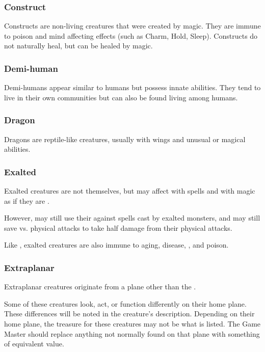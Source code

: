\begin{multicols*}{2}
\subsubsection{Construct}
Constructs are non-living creatures that were created by magic. They are immune to poison and mind affecting effects (such as Charm, Hold, Sleep). Constructs do not naturally heal, but can be healed by magic.

\subsubsection{Demi-human}
Demi-humans appear similar to humans but possess innate abilities. They tend to live in their own communities but can also be found living among humans.

\subsubsection{Dragon}
Dragons are reptile-like creatures, usually with wings and unusual or magical abilities.

\subsubsection{Exalted}
Exalted creatures are not  themselves, but may affect  with spells and with magic as if they are .

However,  may still use their  against spells cast by exalted monsters, and may still save vs. physical attacks to take half damage from their physical attacks.

Like , exalted creatures are also immune to aging, disease, , and poison.

\subsubsection{Extraplanar}
Extraplanar creatures originate from a plane other than the .

Some of these creatures look, act, or function differently on their home plane. These differences will be noted in the creature's description. Depending on their home plane, the treasure for these creatures may not be what is listed. The Game Master should replace anything not normally found on that plane with something of equivalent value.


\end{multicols*}
